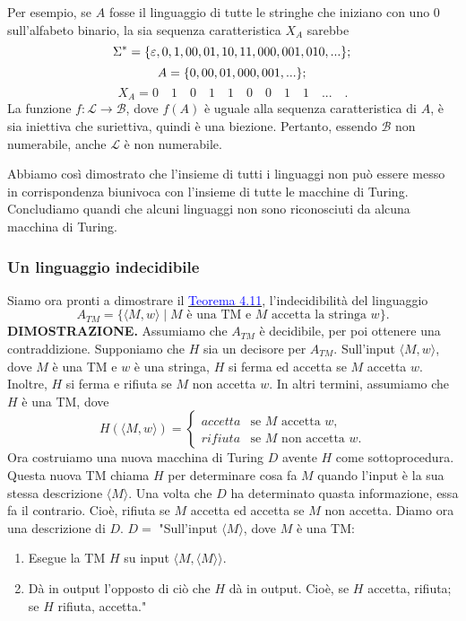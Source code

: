 \documentclass{article}
\begin{document}
Per esempio, se $A$ fosse il linguaggio di tutte le stringhe che iniziano con uno 0 sull'alfabeto binario, la sia sequenza caratteristica $X_A$ sarebbe
$$
\Sigma^* = \{\varepsilon, 0, 1, 00, 01, 10, 11, 000, 001, 010, ...\}; \\
$$
$$
A = \{ 0, 00,01, 000, 001,...\}; \\
$$
$$
X_A = 0\quad 1\quad 0\quad 1\quad 1\quad 0\quad 0\quad 1\quad 1\quad ...\quad.
$$
La funzione $f: \mathcal{L} \rightarrow \mathcal{B}$, dove $f(A)$ è uguale alla sequenza caratteristica di $A$, è sia iniettiva che suriettiva, quindi è una biezione.
Pertanto, essendo $\mathcal{B}$ non numerabile, anche $\mathcal{L}$ è non numerabile.

Abbiamo così dimostrato che l'insieme di tutti i linguaggi non può essere messo in corrispondenza biunivoca con l'insieme di tutte le macchine di Turing.
Concludiamo quandi che alcuni linguaggi non sono riconosciuti da alcuna macchina di Turing.

\subsubsection{Un linguaggio indecidibile}
Siamo ora pronti a dimostrare il \hyperref[teorema-4.11]{\textcolor{blue}{Teorema 4.11}}, l'indecidibilità del linguaggio
$$
A_{TM} = \{\langle M,w \rangle \mid M \text{ è una TM e } M \text{ accetta la stringa } w \}.
$$
\vspace{1em}
\text{}
\newline
\hbox{\textbf{DIMOSTRAZIONE.}}
Assumiamo che $A_{TM}$ è decidibile, per poi ottenere una contraddizione.
Supponiamo che $H$ sia un decisore per $A_{TM}$.
Sull'input $\langle M,w \rangle$, dove $M$ è una TM e $w$ è una stringa, $H$ si ferma ed accetta se $M$ accetta $w$.
Inoltre, $H$ si ferma e rifiuta se $M$ non accetta $w$.
In altri termini, assumiamo che $H$ è una TM, dove
$$
H(\langle M,w \rangle) = 
\begin{cases}
    accetta & \text{se } M \text{ accetta } w, \\
    rifiuta & \text{se } M \text{ non accetta } w.
\end{cases}
$$
Ora costruiamo una nuova macchina di Turing $D$ avente $H$ come sottoprocedura.
Questa nuova TM chiama $H$ per determinare cosa fa $M$ quando l'input è la sua stessa descrizione $\langle M \rangle$.
Una volta che $D$ ha determinato quasta informazione, essa fa il contrario.
Cioè, rifiuta se $M$ accetta ed accetta se $M$ non accetta. Diamo ora una descrizione di $D$.
\newline
$D = $ "Sull'input $\langle M \rangle$, dove $M$ è una TM:
\begin{enumerate}
    \item Esegue la TM $H$ su input $\langle M,\langle M \rangle \rangle$.
    \item Dà in output l'opposto di ciò che $H$ dà in output. Cioè, se $H$ accetta, rifiuta; se $H$ rifiuta, accetta."
\end{enumerate}
\end{document}
